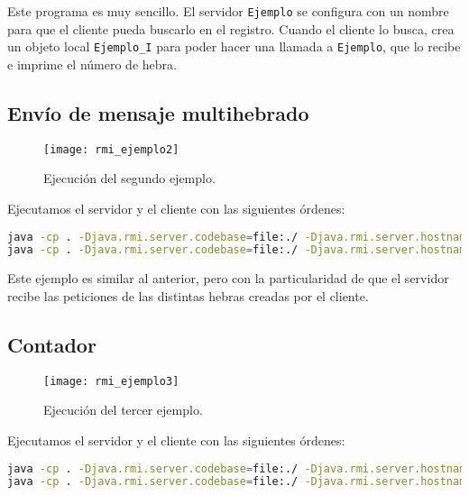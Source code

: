 Este programa es muy sencillo.
El servidor \texttt{Ejemplo} se configura con un nombre para que el cliente pueda buscarlo en el registro.
Cuando el cliente lo busca, crea un objeto local \texttt{Ejemplo\_I} para poder hacer una llamada a \texttt{Ejemplo}, que lo recibe e imprime el número de hebra.

\subsection{Envío de mensaje multihebrado}

\begin{figure}[!ht]
\begin{center}
	\texttt{[image: rmi\_ejemplo2]}
\end{center}
\caption{Ejecución del segundo ejemplo.}
\end{figure}

Ejecutamos el servidor y el cliente con las siguientes órdenes:

\begin{lstlisting}[language=sh]
java -cp . -Djava.rmi.server.codebase=file:./ -Djava.rmi.server.hostname=localhost      -Djava.security.policy=server.policy ejemplo2.Ejemplo
java -cp . -Djava.rmi.server.codebase=file:./ -Djava.rmi.server.hostname=localhost      -Djava.security.policy=server.policy ejemplo2.Cliente_Ejemplo_Multi_Thread       localhost 10
\end{lstlisting}

Este ejemplo es similar al anterior, pero con la particularidad de que el servidor recibe las peticiones de las distintas hebras creadas por el cliente.

\pagebreak

\subsection{Contador}

\begin{figure}[!ht]
\begin{center}
	\texttt{[image: rmi\_ejemplo3]}
\end{center}
\caption{Ejecución del tercer ejemplo.}
\end{figure}

Ejecutamos el servidor y el cliente con las siguientes órdenes:

\begin{lstlisting}[language=sh]
java -cp . -Djava.rmi.server.codebase=file:./ -Djava.rmi.server.hostname=localhost      -Djava.security.policy=server.policy ejemplo3.Servidor
java -cp . -Djava.rmi.server.codebase=file:./ -Djava.rmi.server.hostname=localhost      -Djava.security.policy=server.policy ejemplo3.Cliente
\end{lstlisting}


